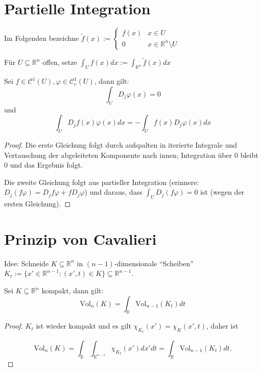 \section{Partielle Integration}
Im Folgenden bezeichne $\tilde f(x):=\begin{cases} f(x) & x\in U \\ 0 & x\in\mathbb R^n \setminus U \end{cases}$
\begin{definition}
	F\"ur $U\subseteq \mathbb R^n$ offen, setze $\int_U f(x)dx := \int_{\mathbb R^n} \tilde f(x)dx$
\end{definition}
\begin{theorem}
	Sei $f\in\mathcal C^1(U), \varphi\in\mathcal C_c^1(U)$, dann gilt:
	$$\int_U D_j\varphi(x)=0$$
	und
	$$\int_U D_j f(x)\varphi(x)dx=-\int_U f(x) D_j\varphi(x)dx$$
\end{theorem}
\begin{proof}
	Die erste Gleichung folgt durch aufspalten in iterierte Integrale und Vertauschung der abgeleiteten Komponente nach innen; Integration \"uber $0$ bleibt $0$ und das Ergebnis folgt.
	
	Die zweite Gleichung folgt aus partieller Integration (erinnere: $D_j(f\varphi) = D_j f\varphi + f D_j\varphi$) und daraus, dass $\int_U D_j(f\varphi)=0$ ist (wegen der ersten Gleichung).
\end{proof}



\section{Prinzip von Cavalieri}
Idee: Schneide $K\subseteq \mathbb R^n$ in $(n-1)$-dimensionale ``Scheiben'' $K_t:=\{x'\in\mathbb R^{n-1}:(x',t)\in K\}\subseteq \mathbb R^{n-1}$.
\begin{theorem}[Cavalieri]
	Sei $K\subseteq \mathbb R^n$ kompakt, dann gilt:
	$$\text{Vol}_n(K) = \int_{\mathbb R}\text{Vol}_{n-1}(K_t)dt$$
\end{theorem}
\begin{proof}
	$K_t$ ist wieder kompakt und es gilt $\chi_{K_t}(x')=\chi_K(x',t)$, daher ist
	
	$$\text{Vol}_n(K) = \int_{\mathbb R}\int_{\mathbb R^{n-1}}\chi_{K_t}(x')dx'dt = \int_{\mathbb R}\text{Vol}_{n-1}(K_t)dt.$$
\end{proof}




